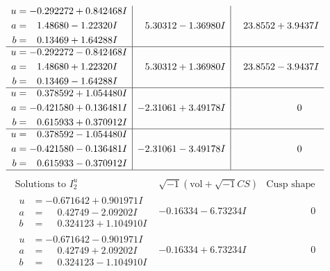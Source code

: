 \documentclass[1p]{elsarticle_modified}
\theoremstyle{definition}
\newcommand{\I}{\sqrt{-1}}
\begin{document}
$$\begin{array}{c|c|c}
\begin{aligned}
u &= -0.292272 + 0.842468 I \\
a &= \phantom{-}1.48680 - 1.22320 I \\
b &= \phantom{-}0.13469 + 1.64288 I\end{aligned}
 & \phantom{-}5.30312 - 1.36980 I & \phantom{-}23.8552 + 3.9437 I \\ \hline\begin{aligned}
u &= -0.292272 - 0.842468 I \\
a &= \phantom{-}1.48680 + 1.22320 I \\
b &= \phantom{-}0.13469 - 1.64288 I\end{aligned}
 & \phantom{-}5.30312 + 1.36980 I & \phantom{-}23.8552 - 3.9437 I \\ \hline\begin{aligned}
u &= \phantom{-}0.378592 + 1.054480 I \\
a &= -0.421580 + 0.136481 I \\
b &= \phantom{-}0.615933 + 0.370912 I\end{aligned}
 & -2.31061 + 3.49178 I & \phantom{-0.000000 } 0 \\ \hline\begin{aligned}
u &= \phantom{-}0.378592 - 1.054480 I \\
a &= -0.421580 - 0.136481 I \\
b &= \phantom{-}0.615933 - 0.370912 I\end{aligned}
 & -2.31061 - 3.49178 I & \phantom{-0.000000 } 0\\
 \hline 
 \end{array}$$\newpage$$\begin{array}{c|c|c}  
\text{Solutions to }I^u_{2}& \I (\text{vol} + \sqrt{-1}CS) & \text{Cusp shape}\\
 \hline 
\begin{aligned}
u &= -0.671642 + 0.901971 I \\
a &= \phantom{-}0.42749 - 2.09202 I \\
b &= \phantom{-}0.324123 + 1.104910 I\end{aligned}
 & -0.16334 - 6.73234 I & \phantom{-0.000000 } 0 \\ \hline\begin{aligned}
u &= -0.671642 - 0.901971 I \\
a &= \phantom{-}0.42749 + 2.09202 I \\
b &= \phantom{-}0.324123 - 1.104910 I\end{aligned}
 & -0.16334 + 6.73234 I & \phantom{-0.000000 } 0 \\ \hline\begin{aligned}

\end{aligned}
\end{array}$$
\end{document}

